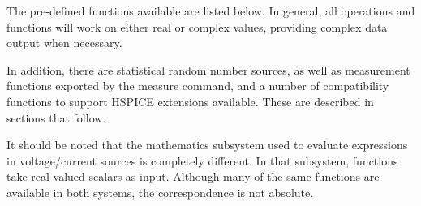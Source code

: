 The pre-defined functions available are listed below.  In general, all
operations and functions will work on either real or complex values,
providing complex data output when necessary.

In addition, there are statistical random number sources, as well as
measurement functions exported by the {\cb measure} command, and a
number of compatibility functions to support HSPICE extensions
available.  These are described in sections that follow.

It should be noted that the mathematics subsystem used to evaluate
expressions in voltage/current sources is completely different.  In
that subsystem, functions take real valued scalars as input.  Although
many of the same functions are available in both systems, the
correspondence is not absolute.

\newcommand{\zzfmt}[1]{{\vt #1({\it vector\/})}}
\newcommand{\zzfmtt}[1]{{\vt #1({\it vector\_x\/}, {\it vector\_y\/})}}

